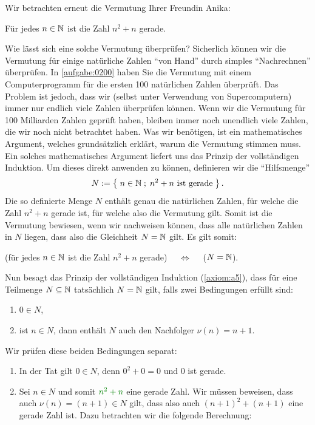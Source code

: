 {
Wir betrachten erneut die Vermutung Ihrer Freundin Anika:
\begin{center}
    Für jedes $n\in\mathbb{N}$ ist die Zahl $n^2+n$ gerade.
\end{center}
Wie lässt sich eine solche Vermutung überprüfen? Sicherlich können wir die Vermutung für einige natürliche Zahlen \enquote{von Hand} durch simples \enquote{Nachrechnen} überprüfen. In \cref{aufgabe:0200} haben Sie die Vermutung mit einem Computerprogramm für die ersten 100 natürlichen Zahlen überprüft. Das Problem ist jedoch, dass wir (selbst unter Verwendung von Supercomputern) immer nur endlich viele Zahlen überprüfen können. Wenn wir die Vermutung für 100 Milliarden Zahlen geprüft haben, bleiben immer noch unendlich viele Zahlen, die wir noch nicht betrachtet haben. Was wir benötigen, ist ein mathematisches Argument, welches grundsätzlich erklärt, warum die Vermutung stimmen muss. Ein solches mathematisches Argument liefert uns das Prinzip der vollständigen Induktion. Um dieses direkt anwenden zu können, definieren wir die \enquote{Hilfsmenge}
\begin{align*}
    N:=\left\{\;n\in\mathbb{N} \; ; \; \text{$n^2+n$ ist gerade} \;\right\}.
\end{align*}
Die so definierte Menge $N$ enthält genau die natürlichen Zahlen, für welche die Zahl $n^2+n$ gerade ist, für welche also die Vermutung gilt. Somit ist die Vermutung bewiesen, wenn wir nachweisen können, dass alle natürlichen Zahlen in $N$ liegen, dass also die Gleichheit $N=\mathbb{N}$ gilt. Es gilt somit:
\begin{center}
    (für jedes $n\in\mathbb{N}$ ist die Zahl $n^2+n$ gerade) $\quad\iff\quad$ ($N = \mathbb{N}$).
\end{center}
Nun besagt das Prinzip der vollständigen Induktion (\cref{axiom:a5}), dass für eine Teilmenge $N\subseteq\mathbb{N}$ tatsächlich $N=\mathbb{N}$ gilt, falls zwei Bedingungen erfüllt sind:
\begin{enumerate}
    \item $0\in N$,
    \item ist $n\in N$, dann enthält $N$ auch den Nachfolger $\nu(n) = n+1$.
\end{enumerate}
Wir prüfen diese beiden Bedingungen separat:
\begin{enumerate}
    \item In der Tat gilt $0\in N$, denn $0^2+0 = 0$ und $0$ ist gerade. \checkmark
    \item Sei $n\in N$ und somit $\textcolor{Green}{n^2+n}$ eine gerade Zahl. Wir müssen beweisen, dass auch $\nu(n)=(n+1)\in N$ gilt, dass also auch $(n+1)^2+(n+1)$ eine gerade Zahl ist. Dazu betrachten wir die folgende Berechnung:

\end{enumerate}}
